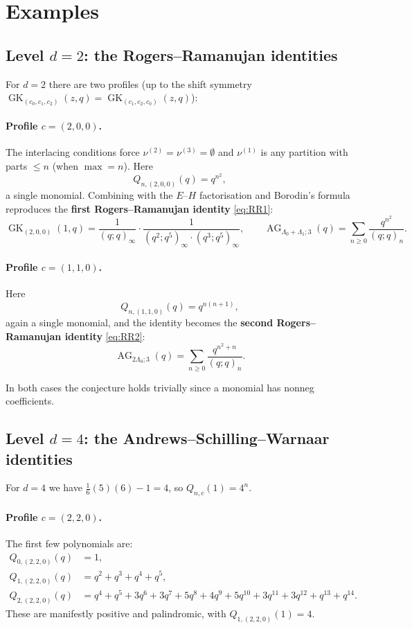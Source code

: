 \documentclass[11pt]{article}
\theoremstyle{plain}
\theoremstyle{definition}
\newcommand{\GK}{\operatorname{GK}}
\newcommand{\AG}{\operatorname{AG}}
\newcommand{\qpoch}[2]{(#1;#2)_\infty}
\newcommand{\qpochn}[3]{(#1;#2)_{#3}}
\begin{document}
\section{Examples}
\label{sec:examples}

\subsection{Level $d = 2$: the Rogers--Ramanujan identities}

For $d = 2$ there are two profiles (up to the shift symmetry
$\GK_{(c_0,c_1,c_2)}(z,q) = \GK_{(c_1,c_2,c_0)}(z,q)$):

\paragraph{Profile $c = (2,0,0)$.}
The interlacing conditions force $\nu^{(2)} = \nu^{(3)} = \emptyset$ and
$\nu^{(1)}$ is any partition with parts $\leq n$ (when $\max = n$).
Here
\[
  Q_{n,(2,0,0)}(q) = q^{n^2},
\]
a single monomial.  Combining with the $E$--$H$ factorisation and Borodin's
formula reproduces the \textbf{first Rogers--Ramanujan identity} \eqref{eq:RR1}:
\[
  \GK_{(2,0,0)}(1,q) = \frac{1}{\qpoch{q}{q}} \cdot
  \frac{1}{\qpoch{q^2}{q^5} \cdot \qpoch{q^3}{q^5}},
  \qquad
  \AG_{\Lambda_0+\Lambda_1;3}(q) = \sum_{n \geq 0} \frac{q^{n^2}}{\qpochn{q}{q}{n}}.
\]

\paragraph{Profile $c = (1,1,0)$.}
Here
\[
  Q_{n,(1,1,0)}(q) = q^{n(n+1)},
\]
again a single monomial, and the identity becomes the
\textbf{second Rogers--Ramanujan identity} \eqref{eq:RR2}:
\[
  \AG_{2\Lambda_0;3}(q) = \sum_{n \geq 0} \frac{q^{n^2+n}}{\qpochn{q}{q}{n}}.
\]

In both cases the conjecture holds trivially since a monomial has
nonneg coefficients.


\subsection{Level $d = 4$: the Andrews--Schilling--Warnaar identities}

For $d = 4$ we have $\frac{1}{6}(5)(6) - 1 = 4$, so $Q_{n,c}(1) = 4^n$.

\paragraph{Profile $c = (2,2,0)$.}
The first few polynomials are:
\begin{align*}
  Q_{0,(2,2,0)}(q) &= 1, \\
  Q_{1,(2,2,0)}(q) &= q^2 + q^3 + q^4 + q^5, \\
  Q_{2,(2,2,0)}(q) &= q^4 + q^5 + 3q^6 + 3q^7 + 5q^8 + 4q^9 + 5q^{10}
    + 3q^{11} + 3q^{12} + q^{13} + q^{14}.
\end{align*}
These are manifestly positive and palindromic, with $Q_{1,(2,2,0)}(1) = 4$.
\end{document}
